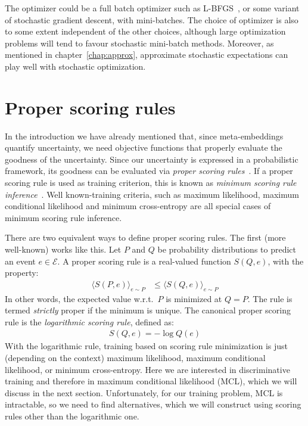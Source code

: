 \documentclass[a4paper,oneside,12pt,english]{report}
\def\expv#1#2{\bigl\langle#1\bigr\rangle_{#2}}
\def\Eset{\mathcal{E}}
\begin{document}
The optimizer could be a full batch optimizer such as L-BFGS~\cite{Nocedal}, or some variant of stochastic gradient descent, with mini-batches. The choice of optimizer is also to some extent independent of the other choices, although large optimization problems will tend to favour stochastic mini-batch methods. Moreover, as mentioned in chapter~\ref{chap:approx}, approximate stochastic expectations can play well with stochastic optimization.

\section{Proper scoring rules}
\def\Dset{\mathcal{D}}
In the introduction we have already mentioned that, since meta-embeddings quantify uncertainty, we need objective functions that properly evaluate the goodness of the uncertainty. Since our uncertainty is expressed in a probabilistic framework, its goodness can be evaluated via \emph{proper scoring rules}~\cite{Gneiting_Raftery_PSR}. If a proper scoring rule is used as training criterion, this is known as \emph{minimum scoring rule inference}~\cite{Dawid_MinScoringRuleInference}. Well known-training criteria, such as maximum likelihood, maximum conditional likelihood and minimum cross-entropy are all special cases of minimum scoring rule inference.

There are two equivalent ways to define proper scoring rules. The first (more well-known) works like this. Let $P$ and $Q$ be probability distributions to predict an event $e\in\Eset$. A proper scoring rule is a real-valued function $S(Q,e)$, with the property:
\begin{align}
\label{eq:psr1}
\expv{S(P,e)}{e\sim P} &\le \expv{S(Q,e)}{e\sim P} 
\end{align}
In other words, the expected value w.r.t.\ $P$ is minimized at $Q=P$. The rule is termed \emph{strictly} proper if the minimum is unique. The canonical proper scoring rule is the \emph{logarithmic scoring rule}, defined as:
\begin{align}
S(Q,e) = -\log Q(e)
\end{align}
With the logarithmic rule, training based on scoring rule minimization is just (depending on the context) maximum likelihood, maximum conditional likelihood, or minimum cross-entropy. Here we are interested in discriminative training and therefore in maximum conditional likelihood (MCL), which we will discuss in the next section. Unfortunately, for our training problem, MCL is intractable, so we need to find alternatives, which we will construct using scoring rules other than the logarithmic one.
\end{document}
